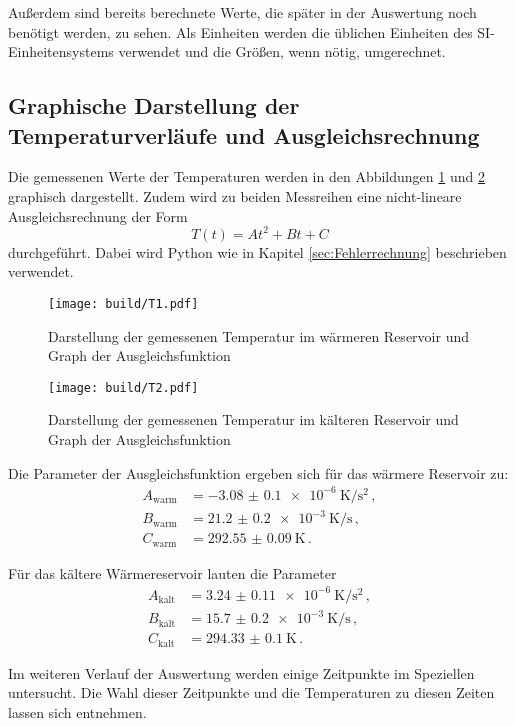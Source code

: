 Außerdem sind bereits berechnete Werte,
die später in der Auswertung noch benötigt werden, zu sehen. Als Einheiten werden
die üblichen Einheiten des SI-Einheitensystems verwendet und die Größen, wenn nötig,
umgerechnet.

\subsection{Graphische Darstellung der Temperaturverläufe und Ausgleichsrechnung}
Die gemessenen Werte der Temperaturen werden in den Abbildungen \ref{fig:temp1} und \ref{fig:temp2}
graphisch dargestellt. Zudem wird zu beiden Messreihen eine nicht-lineare
Ausgleichsrechnung der Form
\begin{equation}
  T(t)=At^2+Bt+C
\end{equation}
durchgeführt. Dabei wird Python wie in Kapitel \ref{sec:Fehlerrechnung} beschrieben
verwendet.

\begin{figure}
  \centering
  \texttt{[image: build/T1.pdf]}
  \caption{Darstellung der gemessenen Temperatur im wärmeren Reservoir
   und Graph der Ausgleichsfunktion}
  \label{fig:temp1}
\end{figure}

\begin{figure}
  \centering
  \texttt{[image: build/T2.pdf]}
  \caption{Darstellung der gemessenen Temperatur im kälteren Reservoir
   und Graph der Ausgleichsfunktion}
  \label{fig:temp2}
\end{figure}

Die Parameter der Ausgleichsfunktion ergeben sich für das wärmere Reservoir zu:
\begin{align*}
  A_\text{warm}&=\SI{-3.08(010)e-6}{\kelvin\per\second\squared}  \,, \\
  B_\text{warm}&=\SI{21.2(02)e-3}{\kelvin\per\second} \,,  \\
  C_\text{warm}&=\SI{292.55(009)}{\kelvin}  \,.
\end{align*}

Für das kältere Wärmereservoir lauten die Parameter
\begin{align*}
  A_\text{kalt}&=\SI{3.24(011)e-6}{\kelvin\per\second\squared}  \,, \\
  B_\text{kalt}&=\SI{15.7(02)e-3}{\kelvin\per\second} \,,  \\
  C_\text{kalt}&=\SI{294.33(010)}{\kelvin}  \,.
\end{align*}

Im weiteren Verlauf der Auswertung werden einige Zeitpunkte im Speziellen untersucht.
Die Wahl dieser Zeitpunkte und die Temperaturen zu diesen Zeiten lassen sich
\label{fig:ausgewaehltemesswerte} entnehmen.

